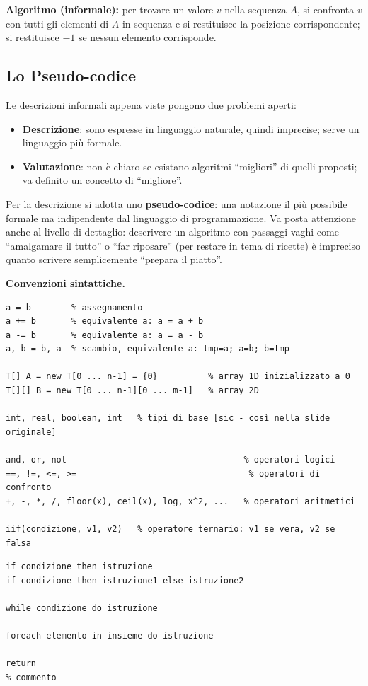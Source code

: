 \documentclass[12pt, a4paper]{article}
\begin{document}
\textbf{Algoritmo (informale):} per trovare un valore $v$ nella sequenza $A$, si confronta $v$ con tutti gli elementi di $A$ in sequenza e si restituisce la posizione corrispondente; si restituisce $-1$ se nessun elemento corrisponde.

\subsection{Lo Pseudo-codice}
\label{sec:pseudocodice}

Le descrizioni informali appena viste pongono due problemi aperti:
\begin{itemize}
    \item \textbf{Descrizione}: sono espresse in linguaggio naturale, quindi imprecise; serve un linguaggio più formale.
    \item \textbf{Valutazione}: non è chiaro se esistano algoritmi ``migliori'' di quelli proposti; va definito un concetto di ``migliore''.
\end{itemize}

Per la descrizione si adotta uno \textbf{pseudo-codice}: una notazione il più possibile formale ma indipendente dal linguaggio di programmazione. Va posta attenzione anche al livello di dettaglio: descrivere un algoritmo con passaggi vaghi come ``amalgamare il tutto'' o ``far riposare'' (per restare in tema di ricette) è impreciso quanto scrivere semplicemente ``prepara il piatto''.

\textbf{Convenzioni sintattiche.}
\begin{verbatim}
a = b        % assegnamento
a += b       % equivalente a: a = a + b
a -= b       % equivalente a: a = a - b
a, b = b, a  % scambio, equivalente a: tmp=a; a=b; b=tmp

T[] A = new T[0 ... n-1] = {0}          % array 1D inizializzato a 0
T[][] B = new T[0 ... n-1][0 ... m-1]   % array 2D

int, real, boolean, int   % tipi di base [sic - così nella slide originale]

and, or, not                                   % operatori logici
==, !=, <=, >=                                  % operatori di confronto
+, -, *, /, floor(x), ceil(x), log, x^2, ...   % operatori aritmetici

iif(condizione, v1, v2)   % operatore ternario: v1 se vera, v2 se falsa
\end{verbatim}

\begin{verbatim}
if condizione then istruzione
if condizione then istruzione1 else istruzione2

while condizione do istruzione

foreach elemento in insieme do istruzione

return
% commento
\end{verbatim}
\end{document}

